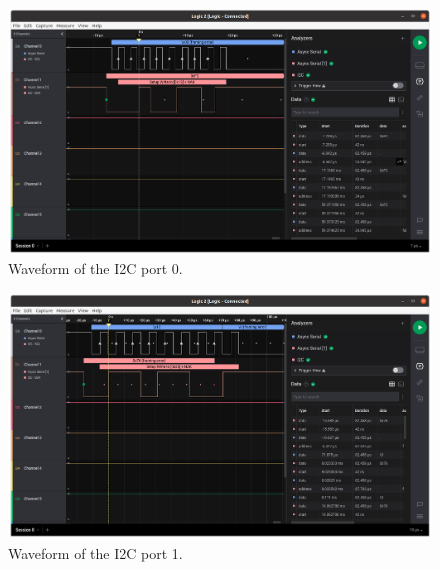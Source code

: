 \begin{figure}[!ht]
    \begin{center}
        \includegraphics[width=\columnwidth]{figures/v07/obdh2-pl-i2c.png}
        \caption{Waveform of the I2C port 0.}
        \label{fig:test-i2c-0}
    \end{center}
\end{figure}

\begin{figure}[!ht]
    \begin{center}
        \includegraphics[width=\columnwidth]{figures/v07/obdh2-eps-i2c.png}
        \caption{Waveform of the I2C port 1.}
        \label{fig:test-i2c-1}
    \end{center}
\end{figure}

